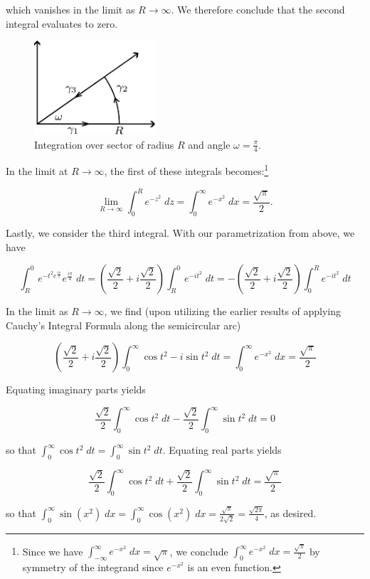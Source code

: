 \begin{solution}
    which vanishes in the limit as $R \to \infty$. We therefore conclude that the second integral evaluates to zero. 

    \begin{figure}[h]
        \centering
        \includegraphics*[width=0.4\textwidth]{problem_3.png}
        \caption{Integration over sector of radius $R$ and angle $\omega = \frac{\pi}{4}$.}
        \label{fig:problem_1}
    \end{figure}

    In the limit at $R \to \infty$, the first of these integrals becomes:\footnote{
        Since we have $\int_{-\infty}^{\infty} e^{-x^2} \; dx = \sqrt{\pi}$, we conclude 
        $\int_{0}^{\infty} e^{-x^2} \; dx = \frac{\sqrt{\pi}}{2}$ by symmetry of the integrand since $e^{-x^2}$ is an 
        even function.
    }

    $$
    \lim_{R \to \infty} \int_{0}^{R} {e^{-z^2}} \; dz = \int_{0}^{\infty} {e^{-x^2}} \; dx = \frac{\sqrt{\pi}}{2}.
    $$

    Lastly, we consider the third integral. With our parametrization from above, we have

    $$
        \int_R^0 {e^{-t^2 e^{\frac{i \pi}{2}}}} e^{\frac{i \pi}{4}} \; dt 
        = \left(\frac{\sqrt{2}}{2} + i \frac{\sqrt{2}}{2} \right) \int_R^0 {e^{-i t^2}} \; dt 
        = -\left(\frac{\sqrt{2}}{2} + i \frac{\sqrt{2}}{2} \right) \int_0^R {e^{-i t^2}} \; dt 
    $$

    In the limit as $R \to \infty$, we find (upon utilizing the earlier results of applying Cauchy's Integral Formula 
    along the semicircular arc)

    $$
    \left(\frac{\sqrt{2}}{2} + i \frac{\sqrt{2}}{2} \right) \int_0^{\infty} {\cos{t^2} - i \sin{t^2} \; dt}
    = \int_{0}^{\infty} {e^{-x^2}} \; dx 
    = \frac{\sqrt{\pi}}{2}
    $$

    Equating imaginary parts yields

    $$
    \frac{\sqrt{2}}{2} \int_0^{\infty} {\cos{t^2} \; dt} - \frac{\sqrt{2}}{2} \int_0^{\infty} {\sin{t^2} \; dt} = 0
    $$

    so that $\int_0^{\infty} {\cos{t^2} \; dt} = \int_0^{\infty} {\sin{t^2} \; dt}$. Equating real parts yields

    $$
    \frac{\sqrt{2}}{2} \int_0^{\infty} {\cos{t^2} \; dt} + \frac{\sqrt{2}}{2} \int_0^{\infty} {\sin{t^2} \; dt} = \frac{\sqrt{\pi}}{2}
    $$

    so that 
    $
    \int_{0}^{\infty}{\sin{\left( x^2 \right)} \; dx} 
    = \int_{0}^{\infty}{\cos{\left( x^2 \right)} \; dx} 
    = \frac{\sqrt{\pi}}{2 \sqrt{2}}
    = \frac{\sqrt{2 \pi}}{4}
    $, as desired.
    \ \\
\end{solution}